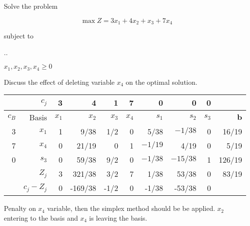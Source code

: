 \documentclass[../main.tex]{subfiles}
\begin{document}
\printanswers

\begin{questions}
  \question %
  
Solve the problem

\[ \max Z = 3x_1 + 4x_2 + x_3 + 7x_4\]

{\centering
  subject to
  \vspace{2mm}

  \sysdelim..%
  \vspace{2mm}

  $x_1, x_2, x_3, x_4 \geq 0$
  \par}

\vspace{3mm}

Discuss the effect of deleting variable $x_4$ on the optimal solution.

\begin{solution}{}

  {\centering
    \begin{tabular}{rrrrrrrrrr}
      \toprule
      &$c_j$&3&4&1&7&0&0&0&\\
      \midrule
      $c_B$&Basis&$x_1$&$x_2$&$x_3$&$x_4$&$s_1$&$s_2$&$s_3$&$\pmb{b}$\\
      \midrule
3&$x_1$&1&   9/38  &   1/2   &0&   5/38  &$-   1/38$  &0&  16/19  \\
7&$x_4$&0&  21/19  &0&1&$-   1/19$  &   4/19  &0&   5/19  \\
      0&$s_3$&0&  59/38  &   9/2   &0&$-   1/38$  &$-  15/38$  &1& 126/19  \\
      \midrule
&$Z_j$&3&321/38&3/2&7&1/38&53/38&0&83/19\\
&$c_j - Z_j$&0&-169/38&-1/2&0&-1/38&-53/38&0&\\
\toprule
    \end{tabular}
  \par}

\vspace{5mm}
Penalty on $x_4$ variable, then the simplex method should be be applied. $x_2$ entering to the basis and $x_4$ is leaving the basis.


\end{solution}
\end{questions}
\end{document}
